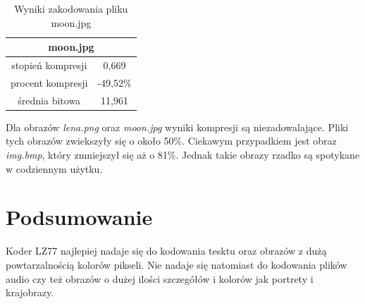 \documentclass[12pt]{article}
\begin{document}
\begin{table}[ht!]
  \centering
  \begin{tabular}{|c|c|}
    \hline
    \multicolumn{2}{|c|}{moon.jpg} \\
    \hline
    \hline
    stopień kompresji & 0,669\\
    procent kompresji & -49,52\%\\
    średnia bitowa & 11,961 \\
    \hline
  \end{tabular}
  \caption{Wyniki zakodowania pliku moon.jpg}
  \label{image:3}
\end{table}

Dla obrazów \textit{lena.png} oraz \textit{moon.jpg} wyniki kompresji są niezadowalające.
Pliki tych obrazów zwiekszyły się o około 50\%. 
Ciekawym przypadkiem jest obraz \textit{img.bmp}, który zmniejszył się aż o 81\%.
Jednak takie obrazy rzadko są spotykane w codziennym użytku.

\section{Podsumowanie}

Koder LZ77 najlepiej nadaje się do kodowania tesktu oraz obrazów z dużą powtarzalnością kolorów pikseli.
Nie nadaje się natomiast do kodowania plików audio czy też obrazów o dużej ilości szczegółów i kolorów jak portrety i krajobrazy.
\end{document}
